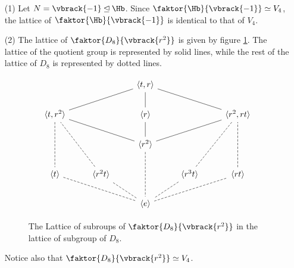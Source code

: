 \begin{example}\label{3.7}
    \begin{enumerate}
        \item[(1)] Let $N=\vbrack{-1} \unlhd \Hb$. Since
            $\faktor{\Hb}{\vbrack{-1}} \simeq V_4$, the lattice of
            $\faktor{\Hb}{\vbrack{-1}}$ is identical to that of $V_4$.

        \item[(2)] The lattice of $\faktor{D_8}{\vbrack{r^2}}$ is given by
            figure \ref{fig_3.4}. The lattice of the quotient group is
            represented by solid lines, while the rest of the lattice of $D_8$
            is represented by dotted lines.

            \begin{figure}[h]
\[\begin{tikzcd}
	&& {\langle t,r \rangle} \\
	{\langle t,r^2 \rangle} && {\langle r \rangle} && {\langle r^2,rt \rangle} \\
	&& {\langle r^2 \rangle} \\
	{\langle t \rangle} & {\langle r^2t \rangle} && {\langle r^3t \rangle} & {\langle rt \rangle} \\
	&& {\langle e \rangle}
	\arrow[no head, from=1-3, to=2-1]
	\arrow[no head, from=2-1, to=3-3]
	\arrow[no head, from=3-3, to=2-5]
	\arrow[no head, from=2-5, to=1-3]
	\arrow[no head, from=1-3, to=2-3]
	\arrow[no head, from=2-3, to=3-3]
	\arrow[dashed, no head, from=3-3, to=5-3]
	\arrow[dashed, no head, from=2-1, to=4-1]
	\arrow[dashed, no head, from=4-1, to=5-3]
	\arrow[dashed, no head, from=5-3, to=4-5]
	\arrow[dashed, no head, from=4-5, to=2-5]
	\arrow[dashed, no head, from=2-5, to=4-4]
	\arrow[dashed, no head, from=4-4, to=5-3]
	\arrow[dashed, no head, from=5-3, to=4-2]
	\arrow[dashed, no head, from=4-2, to=2-1]
\end{tikzcd}\]
                \caption{The Lattice of subroups of $\faktor{D_8}{\vbrack{r^2}}$
                in the lattice of subgroup of $D_8$.}
                \label{fig_3.4}
            \end{figure}
            Notice also that $\faktor{D_8}{\vbrack{r^2}} \simeq V_4$.
    \end{enumerate}
\end{example}
